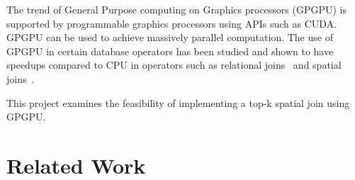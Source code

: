 The trend of General Purpose computing on Graphics processors (GPGPU) is supported by programmable graphics processors using APIs such as CUDA\@. GPGPU can be used to achieve massively parallel computation. The use of GPGPU in certain database operators has been studied and shown to have speedups compared to CPU in operators such as relational joins~\cite{he2008relational} and spatial joins~\cite{yampaka2012spatial}.

This project examines the feasibility of implementing a top-k spatial join using GPGPU\@.

\section{Related Work}


